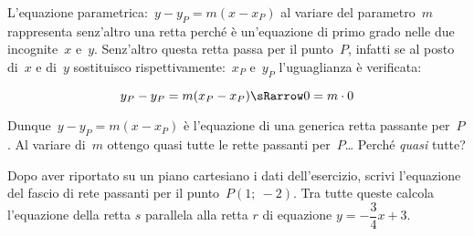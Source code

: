 L'equazione parametrica:~\(y - y_P = m (x - x_P)\) al variare del 
parametro~\(m\) 
rappresenta senz'altro una retta perché è un'equazione di primo grado nelle 
due incognite~\(x\) e~\(y\). Senz'altro questa retta passa per il punto~\(P\), 
infatti se al posto di~\(x\) e di~\(y\) sostituisco 
rispettivamente:~\(x_P\) e~\(y_P\) l'uguaglianza è verificata:

\[y_P - y_P = m (x_P - x_P) \sRarrow 0 = m \cdot 0\]

Dunque~\(y - y_P = m (x - x_P)\) è l'equazione di una generica retta passante 
per~\(P\). Al variare di~\(m\) ottengo quasi tutte le rette passanti 
per~\(P\)\dots 
Perché \emph{quasi} tutte?

 \begin{esempio}
  Dopo aver riportato su un piano cartesiano i dati dell'esercizio,
  scrivi l'equazione del fascio di rete passanti per il punto~\(P(1;~-2)\).
  Tra tutte queste calcola l'equazione della retta \(s\) parallela alla retta 
  \(r\) di equazione \(y=-\dfrac{3}{4}x+3\).

\begin{inaccessibleblock}
 \begin{figure}[h]
 \centering
{}
\label{fig:metodorapido}
\end{figure}
\end{inaccessibleblock}
 \end{esempio}
 
